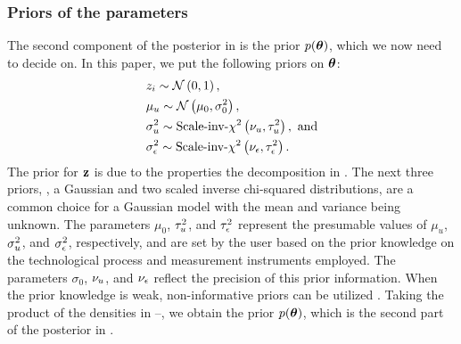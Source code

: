 \subsubsection{Priors of the parameters}
The second component of the posterior in  is the prior $\f{\vparam}$, which we now need to decide on. In this paper, we put the following priors on ${\boldsymbol\theta}$:
\begin{align}
  & \z_i \sim \gaussian{0}{1}, \elabel{z-prior} \\
  & \mu_\u \sim \gaussian{\mu_0}{\sigma^2_0}, \elabel{mu-u-prior} \\
  & \sigma^2_\u \sim \sichisquared{\nu_\u}{\tau^2_\u}, \text{ and} \elabel{sigma2-u-prior} \\
  & \sigma^2_\noise \sim \sichisquared{\nu_\noise}{\tau^2_\noise}. \elabel{sigma2-noise-prior}
\end{align}
The prior for $\mathbf{z}$ is due to the properties the decomposition in .
The next three priors, \ie, a Gaussian and two scaled inverse chi-squared distributions, are a common choice for a Gaussian model with the mean and variance being unknown.
The parameters $\mu_0$, $\tau^2_u$, and $\tau^2_\epsilon$ represent the presumable values of $\mu_u$, $\sigma^2_u$, and $\sigma^2_\epsilon$, respectively, and are set by the user based on the prior knowledge on the technological process and measurement instruments employed. The parameters $\sigma_0$, $\nu_u$, and $\nu_\epsilon$ reflect the precision of this prior information.
When the prior knowledge is weak, non-informative priors can be utilized \cite{gelman2004, bernardo2007}.
Taking the product of the densities in --, we obtain the prior $\f{\vparam}$, which is the second part of the posterior in .

